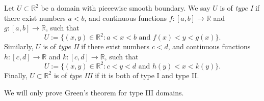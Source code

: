 \documentclass[12pt]{book}
\newcommand{\R}{{\mathbb{R}}}
\theoremstyle{plain}
\newtheorem{thm}{Theorem}[section]
\theoremstyle{remark}
\theoremstyle{definition}
\theoremstyle{exercise}
\theoremstyle{example}
\begin{document}
Let $U \subset \R^2$ be a domain with piecewise smooth boundary.
We say $U$ is of \emph{type I}
if there exist numbers
$a < b$, and continuous
functions $f \colon [a,b] \to \R$ and
$g \colon [a,b] \to \R$, such that
\begin{equation*}
U := \{ (x,y) \in \R^2 : a < x < b \text{ and } f(x) < y < g(x) \} .
\end{equation*}
Similarly, $U$ is of \emph{type II}
if there exist numbers
$c < d$, and continuous
functions $h \colon [c,d] \to \R$ and
$k \colon [c,d] \to \R$, such that
\begin{equation*}
U := \{ (x,y) \in \R^2 : c < y < d \text{ and } h(y) < x < k(y) \} .
\end{equation*}
Finally, $U \subset \R^2$ is of \emph{type III}
if it is both of type I and type II.


We will only prove Green's theorem for type III domains.

\end{document}
